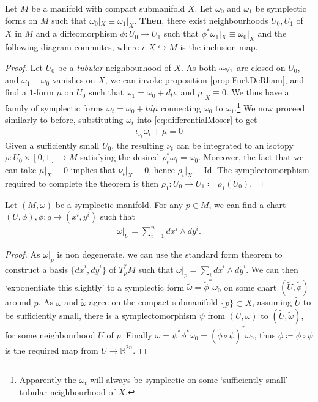 \documentclass[11pt, final]{article}
\begin{document}
\begin{theorem}
	Let $M$ be a manifold with compact submanifold $X$.	Let $\omega_0$ and $\omega_1$ be symplectic forms on $M$ such that $\omega_0|_X \equiv \omega_1|_X$. \textbf{Then}, there exist neighbourhoods $U_0,U_1$ of $X$ in $M$ and a diffeomorphism $\phi: U_0 \to U_1$ such that $\phi^* \omega_1|_X \equiv \omega_0|_X$ and the following diagram commutes, where $i: X \hookrightarrow M$ is the inclusion map.
	\begin{center}
		
	\end{center}
\end{theorem}
\begin{proof}
	Let $U_0$ be a \textit{tubular} neighbourhood of $X$. As both $\omega_{\nicefrac{0}{1}}$ are closed on $U_0$, and $\omega_1 - \omega_0$ vanishes on $X$, we can invoke proposition \ref{prop:FuckDeRham}, and find a $1$-form $\mu$ on $U_0$ such that $\omega_1 = \omega_0 + d \mu$, and $\mu|_X \equiv 0$. We thus have a family of symplectic forms $\omega_t = \omega_0 + td\mu$ connecting $\omega_0$ to $\omega_1$.\footnote{Apparently the $\omega_t$ will always be symplectic on some `sufficiently small' tubular neighbourhood of $X$.} We now proceed similarly to before, substituting $\omega_t$ into \eqref{eq:differentialMoser} to get
		\begin{align}
			\iota_{\nu_t} \omega_t + \mu = 0
		\end{align}
Given a sufficiently small $U_0$, the resulting $\nu_t$ can be integrated to an isotopy $\rho: U_0 \times [0,1] \to M$ satisfying the desired $\rho_t^* \omega_t = \omega_0$. Moreover, the fact that we can take $\mu|_X \equiv 0$ implies that $\nu_t|_X \equiv 0$, hence $\rho_t|_X \equiv \mathrm{Id}$. The symplectomorphism required to complete the theorem is then $\rho_1 : U_0 \to U_1 \coloneqq \rho_1(U_0)$.
\end{proof}

\begin{theorem}[Darboux]
	Let $(M,\omega)$ be a symplectic manifold. For any $p \in M$, we can find a chart $(U, \phi), \phi: q \mapsto (x^i, y^i)$ such that
		\begin{align}
			\omega|_U = \sum_{i=1}^{n} dx^i \wedge dy^i.
		\end{align}		 
\end{theorem}
\begin{proof}
	As $\omega|_p$ is non degenerate, we can use the standard form theorem to construct a basis $\{ d\tilde{x}^i, d\tilde{y}^i \}$ of $T^*_pM$ such that $\omega|_p = \sum_i d\tilde{x}^i\wedge d\tilde{y}^i$. We can then `exponentiate this slightly' to a symplectic form $\tilde{\omega} = \tilde{\phi}^* \omega_0$ on some chart $(\tilde{U}, \tilde{\phi})$ around $p$. As $\omega$ and $\tilde{\omega}$ agree on the compact submanifold $\{p\} \subset X$, assuming $\tilde{U}$ to be sufficiently small, there is a symplectomorphism $\psi$ from $(U,\omega)$ to $(\tilde{U},\tilde{\omega})$, for some neighbourhood $U$ of $p$. Finally $\omega = \psi^* \phi^* \omega_0 = (\tilde{\phi} \circ \psi)^* \omega_0$, thus $\phi \coloneqq \tilde{\phi} \circ \psi$ is the required map from $U \to \mathbb{R}^{2n}$.
\end{proof}
\end{document}
